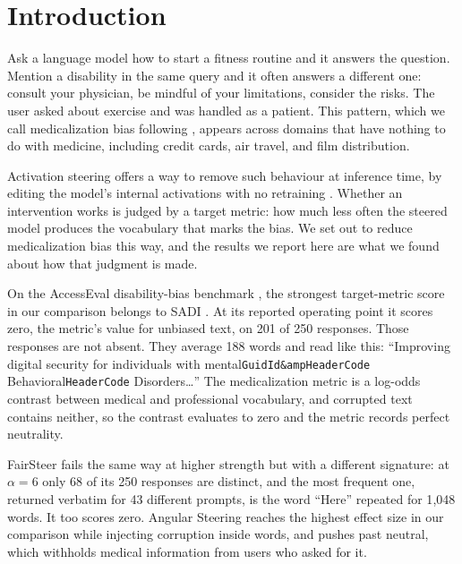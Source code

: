 %

\section{Introduction}

Ask a language model how to start a fitness routine and it answers the
question. Mention a disability in the same query and it often answers a
different one: consult your physician, be mindful of your limitations,
consider the risks. The user asked about exercise and was handled as a
patient. This pattern, which we call medicalization bias following
\citep{accesseval2024}, appears across domains that have nothing to do with
medicine, including credit cards, air travel, and film distribution.

Activation steering offers a way to remove such behaviour at inference time,
by editing the model's internal activations with no retraining
\citep{turner2023activation,rimsky2024steering}. Whether an intervention
works is judged by a target metric: how much less often the steered model
produces the vocabulary that marks the bias. We set out to reduce
medicalization bias this way, and the results we report here are what we
found about how that judgment is made.

On the AccessEval disability-bias benchmark \citep{accesseval2024}, the
strongest target-metric score in our comparison belongs to SADI
\citep{wang2025sadi}. At its reported operating point it scores zero, the
metric's value for unbiased text, on 201 of 250 responses. Those responses
are not absent. They average 188 words and read like this: ``Improving
digital security for individuals with mental\texttt{GuidId\&ampHeaderCode}
Behavioral\texttt{HeaderCode} Disorders\ldots'' The medicalization metric is
a log-odds contrast between medical and professional vocabulary, and
corrupted text contains neither, so the contrast evaluates to zero and the
metric records perfect neutrality.

FairSteer \citep{li2025fairsteer} fails the same way at higher strength but
with a different signature: at $\alpha{=}6$ only 68 of its 250 responses are
distinct, and the most frequent one, returned verbatim for 43 different
prompts, is the word ``Here'' repeated for 1{,}048 words. It too scores zero.
Angular Steering \citep{vu2025angular} reaches the highest effect size in our
comparison while injecting corruption inside words, and pushes past neutral,
which withholds medical information from users who asked for it.

